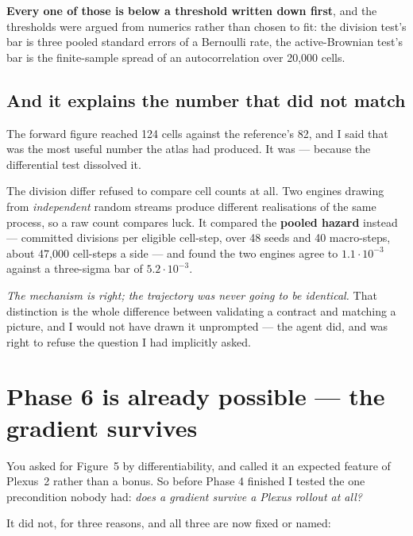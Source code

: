 \documentclass[11pt,a4paper]{article}
\begin{document}
\textbf{Every one of those is below a threshold written down first}, and the thresholds were
argued from numerics rather than chosen to fit: the division test's bar is three pooled standard
errors of a Bernoulli rate, the active-Brownian test's bar is the finite-sample spread of an
autocorrelation over 20{,}000 cells.

\subsection{And it explains the number that did not match}

The forward figure reached 124 cells against the reference's 82, and I said that was the most
useful number the atlas had produced. It was --- because the differential test dissolved it.

The division differ refused to compare cell counts at all. Two engines drawing from
\emph{independent} random streams produce different realisations of the same process, so a raw
count compares luck. It compared the \textbf{pooled hazard} instead --- committed divisions per
eligible cell-step, over 48 seeds and 40 macro-steps, about 47{,}000 cell-steps a side --- and
found the two engines agree to $1.1{\cdot}10^{-3}$ against a three-sigma bar of
$5.2{\cdot}10^{-3}$.

\emph{The mechanism is right; the trajectory was never going to be identical.} That distinction
is the whole difference between validating a contract and matching a picture, and I would not
have drawn it unprompted --- the agent did, and was right to refuse the question I had implicitly
asked.

\section{Phase 6 is already possible --- the gradient survives}\label{sec:grad}

You asked for Figure~5 by differentiability, and called it an expected feature of Plexus~2 rather
than a bonus. So before Phase 4 finished I tested the one precondition nobody had: \emph{does a
gradient survive a Plexus rollout at all?}

It did not, for three reasons, and all three are now fixed or named:
\end{document}
